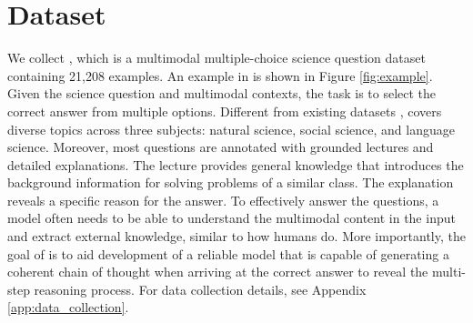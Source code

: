 \section{Dataset}
\label{sec:dataset}

We collect \name{}, which is a multimodal multiple-choice science question dataset containing 21,208 examples. An example in \name{} is shown in Figure \ref{fig:example}. Given the science question and multimodal contexts, the task is to select the correct answer from multiple options. Different from existing datasets \cite{sachan2017textbooks,kembhavi2016diagram,sampat2020visuo,lu2021inter,krishnamurthy2016semantic}, \name{} covers diverse topics across three subjects: natural science, social science, and language science. Moreover, most questions are annotated with grounded lectures and detailed explanations. The lecture provides general knowledge that introduces the background information for solving problems of a similar class. The explanation reveals a specific reason for the answer. To effectively answer the questions, a model often needs to be able to understand the multimodal content in the input and extract external knowledge, similar to how humans do. More importantly, the goal of \name{} is to aid development of a reliable model that is capable of generating a coherent chain of thought when arriving at the correct answer to reveal the multi-step reasoning process. For data collection details, see Appendix \ref{app:data_collection}.


